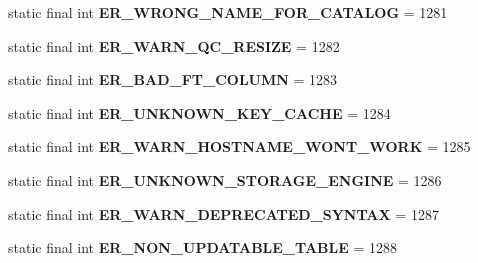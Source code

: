 \begin{DoxyCompactItemize}
static final int {\bfseries E\+R\+\_\+\+W\+R\+O\+N\+G\+\_\+\+N\+A\+M\+E\+\_\+\+F\+O\+R\+\_\+\+C\+A\+T\+A\+L\+OG} = 1281
\item 
\mbox{\label{classcom_1_1mysql_1_1jdbc_1_1_mysql_error_numbers_adab219a1844c2d305225854fa0725ed4}} 
static final int {\bfseries E\+R\+\_\+\+W\+A\+R\+N\+\_\+\+Q\+C\+\_\+\+R\+E\+S\+I\+ZE} = 1282
\item 
\mbox{\label{classcom_1_1mysql_1_1jdbc_1_1_mysql_error_numbers_a7e70c6cf154497f7df99832ed95452ac}} 
static final int {\bfseries E\+R\+\_\+\+B\+A\+D\+\_\+\+F\+T\+\_\+\+C\+O\+L\+U\+MN} = 1283
\item 
\mbox{\label{classcom_1_1mysql_1_1jdbc_1_1_mysql_error_numbers_ae0847bbcbd1a905a06e0863fff83072e}} 
static final int {\bfseries E\+R\+\_\+\+U\+N\+K\+N\+O\+W\+N\+\_\+\+K\+E\+Y\+\_\+\+C\+A\+C\+HE} = 1284
\item 
\mbox{\label{classcom_1_1mysql_1_1jdbc_1_1_mysql_error_numbers_a1fb35348d0efb3e66a1b4db248ebd262}} 
static final int {\bfseries E\+R\+\_\+\+W\+A\+R\+N\+\_\+\+H\+O\+S\+T\+N\+A\+M\+E\+\_\+\+W\+O\+N\+T\+\_\+\+W\+O\+RK} = 1285
\item 
\mbox{\label{classcom_1_1mysql_1_1jdbc_1_1_mysql_error_numbers_a0e1e4bd43259f90db6df9da8f9c3f157}} 
static final int {\bfseries E\+R\+\_\+\+U\+N\+K\+N\+O\+W\+N\+\_\+\+S\+T\+O\+R\+A\+G\+E\+\_\+\+E\+N\+G\+I\+NE} = 1286
\item 
\mbox{\label{classcom_1_1mysql_1_1jdbc_1_1_mysql_error_numbers_a953e1bc8eca08c9e28b97f52c734208c}} 
static final int {\bfseries E\+R\+\_\+\+W\+A\+R\+N\+\_\+\+D\+E\+P\+R\+E\+C\+A\+T\+E\+D\+\_\+\+S\+Y\+N\+T\+AX} = 1287
\item 
\mbox{\label{classcom_1_1mysql_1_1jdbc_1_1_mysql_error_numbers_a1d1eeb7d254f635039eca620398c42f1}} 
static final int {\bfseries E\+R\+\_\+\+N\+O\+N\+\_\+\+U\+P\+D\+A\+T\+A\+B\+L\+E\+\_\+\+T\+A\+B\+LE} = 1288
\item 

\end{DoxyCompactItemize}
